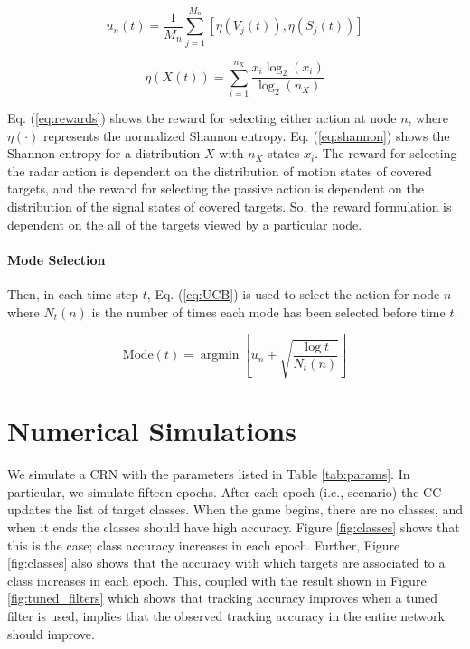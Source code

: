 \documentclass[journal,12pt,onecolumn,draftclsnofoot,]{IEEEtran}
\DeclareMathOperator*{\argmin}{argmin}
\theoremstyle{definition}
\begin{document}
\begin{equation}
\label{eq:rewards}
	u_n(t) = \frac1{M_n}\sum_{j=1}^{M_n}[\eta(V_j(t)), \eta(S_j(t))] 
\end{equation}

\begin{equation}
\label{eq:shannon}
	\eta(X(t)) = \sum_{i=1}^{n_X} \frac{x_i\log_2(x_i)}{\log_2(n_X)}
\end{equation}

Eq. (\ref{eq:rewards}) shows the reward for selecting either action at node $n$, where $\eta(\cdot)$ represents the normalized Shannon entropy. 
Eq. (\ref{eq:shannon}) shows the Shannon entropy for a distribution $X$ with $n_X$ states $x_i$.  
The reward for selecting the radar action is dependent on the distribution of motion states of covered targets, and the reward for selecting the passive action is dependent on the distribution of the signal states of covered targets. 
So, the reward formulation is dependent on the all of the targets viewed by a particular node. 

\paragraph{Mode Selection} Then, in each time step $t$, Eq. (\ref{eq:UCB}) is used to select the action for node $n$ where $N_t(n)$ is the number of times each mode has been selected before time $t$. 

\begin{equation}
\label{eq:UCB}
 \text{Mode}(t) = \argmin \left[u_n + \sqrt{\frac{\log t}{N_t(n)}} \right]
\end{equation}











\section{Numerical Simulations}
\label{sec:simulations}
We simulate a CRN with the parameters listed in Table \ref{tab:params}. 
In particular, we simulate fifteen epochs. 
After each epoch (i.e., scenario) the CC updates the list of target classes. 
When the game begins, there are no classes, and when it ends the classes should have high accuracy. 
Figure \ref{fig:classes} shows that this is the case; class accuracy increases in each epoch. 
Further, Figure \ref{fig:classes} also shows that the accuracy with which targets are associated to a class increases in each epoch. 
This, coupled with the result shown in Figure \ref{fig:tuned_filters} which shows that tracking accuracy improves when a tuned filter is used, implies that the observed tracking accuracy in the entire network should improve. 
\end{document}
